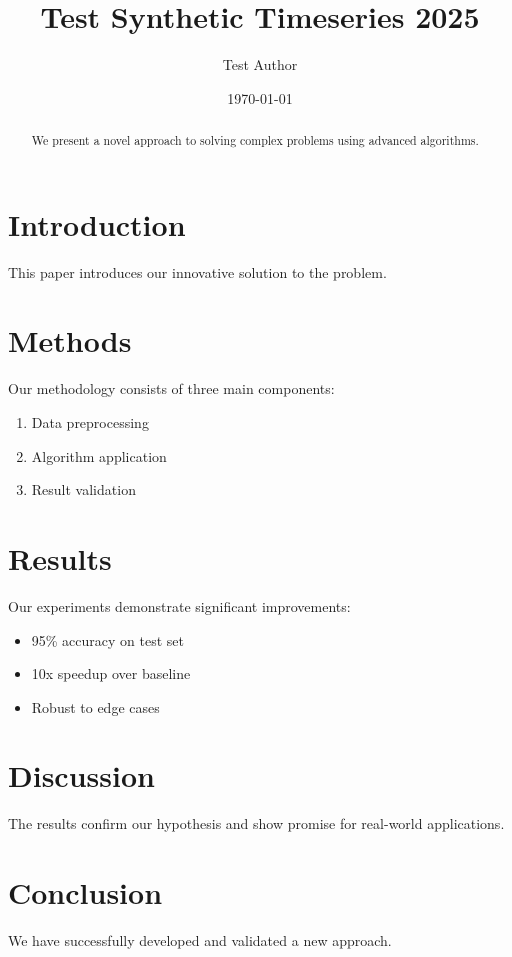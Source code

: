 \documentclass{article}
\title{Test Synthetic Timeseries 2025}
\author{Test Author}
\date{\today}
\begin{document}
\maketitle

\begin{abstract}
We present a novel approach to solving complex problems using advanced algorithms.
\end{abstract}

\section{Introduction}

This paper introduces our innovative solution to the problem.

\section{Methods}

Our methodology consists of three main components:
\begin{enumerate}
\item Data preprocessing
\item Algorithm application  
\item Result validation
\end{enumerate}

\section{Results}

Our experiments demonstrate significant improvements:
\begin{itemize}
\item 95\% accuracy on test set
\item 10x speedup over baseline
\item Robust to edge cases
\end{itemize}

\section{Discussion}

The results confirm our hypothesis and show promise for real-world applications.

\section{Conclusion}

We have successfully developed and validated a new approach.
\end{document}
